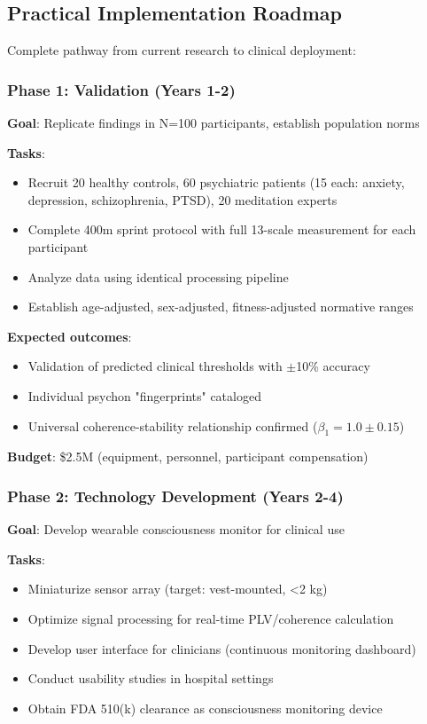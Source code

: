 \documentclass[11pt,onecolumn]{article}
\begin{document}
\subsection{Practical Implementation Roadmap}

Complete pathway from current research to clinical deployment:

\subsubsection{Phase 1: Validation (Years 1-2)}

\textbf{Goal}: Replicate findings in N=100 participants, establish population norms

\textbf{Tasks}:
\begin{itemize}
\item Recruit 20 healthy controls, 60 psychiatric patients (15 each: anxiety, depression, schizophrenia, PTSD), 20 meditation experts
\item Complete 400m sprint protocol with full 13-scale measurement for each participant
\item Analyze data using identical processing pipeline
\item Establish age-adjusted, sex-adjusted, fitness-adjusted normative ranges
\end{itemize}

\textbf{Expected outcomes}:
\begin{itemize}
\item Validation of predicted clinical thresholds with $\pm$10\% accuracy
\item Individual psychon "fingerprints" cataloged
\item Universal coherence-stability relationship confirmed ($\beta_1 = 1.0 \pm 0.15$)
\end{itemize}

\textbf{Budget}: \$2.5M (equipment, personnel, participant compensation)

\subsubsection{Phase 2: Technology Development (Years 2-4)}

\textbf{Goal}: Develop wearable consciousness monitor for clinical use

\textbf{Tasks}:
\begin{itemize}
\item Miniaturize sensor array (target: vest-mounted, <2 kg)
\item Optimize signal processing for real-time PLV/coherence calculation
\item Develop user interface for clinicians (continuous monitoring dashboard)
\item Conduct usability studies in hospital settings
\item Obtain FDA 510(k) clearance as consciousness monitoring device
\end{itemize}
\end{document}
